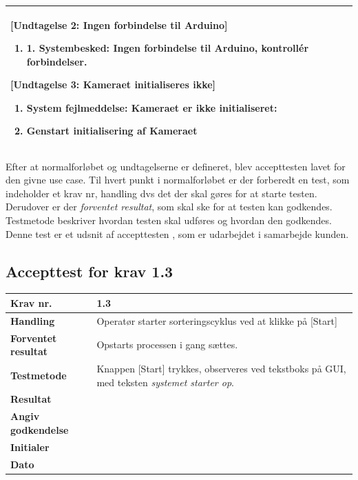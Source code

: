 \begin{center}
\begin{longtable}{ | m{4cm} | m{8cm}| }
			[Undtagelse 2: Ingen forbindelse til Arduino]
			
			\begin{enumerate}
			\item 1.	Systembesked: Ingen forbindelse til Arduino, kontrollér forbindelser.
			\end{enumerate} 
	
			[Undtagelse 3: Kameraet initialiseres ikke]
			
			\begin{enumerate}
			\item System fejlmeddelse: Kameraet er ikke initialiseret:
			\item Genstart initialisering af Kameraet
			\end{enumerate} \\
			\hline
		\end{longtable}
		
	\end{center}

Efter at normalforløbet og undtagelserne er defineret, blev accepttesten lavet for den givne use case. Til hvert punkt i normalforløbet er der forberedt en test, som indeholder et krav nr, handling dvs det der skal gøres for at starte testen. Derudover er der \textit{forventet resultat}, som skal ske for at testen kan godkendes. Testmetode beskriver hvordan testen skal udføres og hvordan den godkendes. Denne test er et udsnit af accepttesten , som er udarbejdet i samarbejde kunden.

\subsection{Accepttest for krav 1.3}
	\begin{center}
		\begin{longtable}{ | m{4cm}| m{8.5cm}|} 
			\hline
			\textbf{Krav nr.} & 1.3    \\ 
			\hline
			\textbf{Handling} &  Operatør starter sorteringscyklus ved at klikke på [Start]  \\
			\hline
			\textbf{Forventet resultat} &  Opstarts processen i gang sættes.  \\
			\hline
			\textbf{Testmetode}  & Knappen [Start] trykkes, observeres ved tekstboks på GUI, med teksten \textit{systemet starter op}.   \\
			\hline
			\textbf{Resultat}  &    \\
			\hline
			\textbf{Angiv godkendelse} &     \\
			\hline
			\textbf{Initialer} &     \\
			\hline
			\textbf{Dato} &    \\
			\hline
		\end{longtable}
	\end{center}
	

